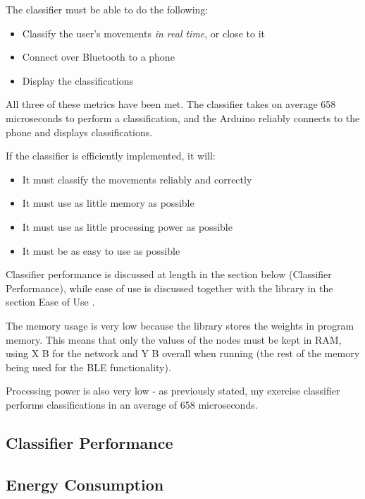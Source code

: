 \documentclass[a4paper]{article}
\begin{document}
The classifier must be able to do the following:

\begin{itemize}
\item Classify the user's movements \textit{in real time}, or close to it
\item Connect over Bluetooth to a phone
\item Display the classifications
\end{itemize}

All three of these metrics have been met. The classifier takes on average 658 microseconds\cite{dsref0} to perform a classification, and the Arduino reliably connects to the phone and displays classifications.

If the classifier is efficiently implemented, it will:

\begin{itemize}
\item It must classify the movements reliably and correctly
\item It must use as little memory as possible
\item It must use as little processing power as possible
\item It must be as easy to use as possible
\end{itemize}

Classifier performance is discussed at length in the section below (Classifier Performance), while ease of use is discussed together with the library in the section Ease of Use .

The memory usage is very low because the library stores the weights in program memory. This means that only the values of the nodes must be kept in RAM, using X B for the network and Y B  overall when running (the rest of the memory being used for the BLE functionality).

Processing power is also very low - as previously stated, my exercise classifier performs classifications in an average of 658 microseconds\cite{dsref0}. 

\subsection{Classifier Performance}%


\subsection{Energy Consumption}%
\end{document}

